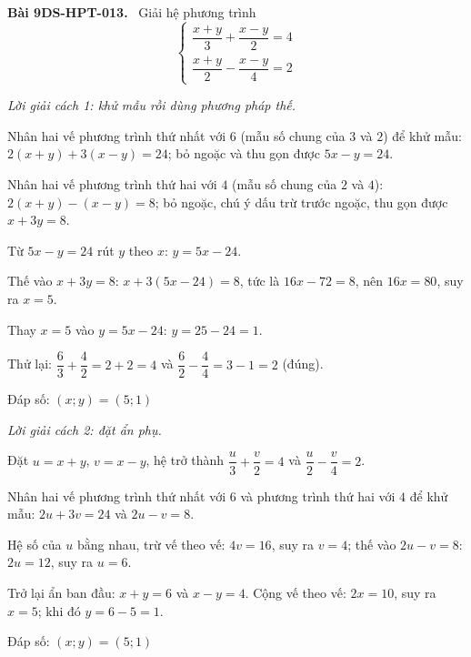 \documentclass[12pt,a4paper]{article}
\newenvironment{problem}[1][]{\par\medskip\noindent\textbf{Bài #1.}\ }{\par}
\newenvironment{solution}[1][]{\par\noindent\textit{Lời giải #1.}\par}{\par}
\begin{document}
\begin{problem}[9DS-HPT-013]
Giải hệ phương trình
\[ \begin{cases} \dfrac{x + y}{3} + \dfrac{x - y}{2} = 4 \\ \dfrac{x + y}{2} - \dfrac{x - y}{4} = 2 \end{cases} \]

\begin{solution}[cách 1: khử mẫu rồi dùng phương pháp thế]
Nhân hai vế phương trình thứ nhất với $6$ (mẫu số chung của $3$ và $2$) để khử mẫu: $2(x + y) + 3(x - y) = 24$; bỏ ngoặc và thu gọn được $5x - y = 24$.

Nhân hai vế phương trình thứ hai với $4$ (mẫu số chung của $2$ và $4$): $2(x + y) - (x - y) = 8$; bỏ ngoặc, chú ý dấu trừ trước ngoặc, thu gọn được $x + 3y = 8$.

Từ $5x - y = 24$ rút $y$ theo $x$: $y = 5x - 24$.

Thế vào $x + 3y = 8$: $x + 3(5x - 24) = 8$, tức là $16x - 72 = 8$, nên $16x = 80$, suy ra $x = 5$.

Thay $x = 5$ vào $y = 5x - 24$: $y = 25 - 24 = 1$.

Thử lại: $\dfrac{6}{3} + \dfrac{4}{2} = 2 + 2 = 4$ và $\dfrac{6}{2} - \dfrac{4}{4} = 3 - 1 = 2$ (đúng).

Đáp số: $\boxed{(x; y) = (5; 1)}$
\end{solution}

\begin{solution}[cách 2: đặt ẩn phụ]
Đặt $u = x + y$, $v = x - y$, hệ trở thành $\dfrac{u}{3} + \dfrac{v}{2} = 4$ và $\dfrac{u}{2} - \dfrac{v}{4} = 2$.

Nhân hai vế phương trình thứ nhất với $6$ và phương trình thứ hai với $4$ để khử mẫu: $2u + 3v = 24$ và $2u - v = 8$.

Hệ số của $u$ bằng nhau, trừ vế theo vế: $4v = 16$, suy ra $v = 4$; thế vào $2u - v = 8$: $2u = 12$, suy ra $u = 6$.

Trở lại ẩn ban đầu: $x + y = 6$ và $x - y = 4$. Cộng vế theo vế: $2x = 10$, suy ra $x = 5$; khi đó $y = 6 - 5 = 1$.

Đáp số: $\boxed{(x; y) = (5; 1)}$
\end{solution}
\end{problem}
\end{document}
